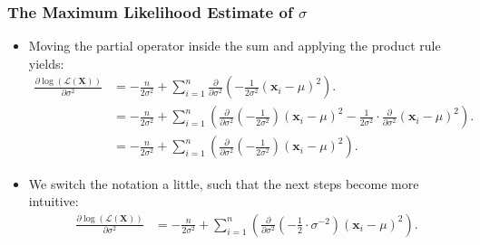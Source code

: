 \begin{frame}
	\frametitle{The Maximum Likelihood Estimate of $\sigma$}
	\begin{itemize}
		\item Moving the partial operator inside the sum and applying the product rule yields:
		      \begin{align}
			      \frac{\partial \log\left(\mathcal{L}(\mathbf{X})\right)}{\partial \sigma^2} & = -\frac{n}{2\sigma^2} + \sum_{i=1}^{n} \frac{\partial}{\partial\sigma^2}\left(-\frac{1}{2\sigma^2} (\mathbf{x}_i-\mu)^2 \right).                                                                                                  \\
			                                                                                  & = -\frac{n}{2\sigma^2} + \sum_{i=1}^{n} \left(\frac{\partial}{\partial\sigma^2} \left(-\frac{1}{2\sigma^2}\right) (\mathbf{x}_i-\mu)^2 - \frac{1}{2\sigma^2} \cdot \frac{\partial}{\partial\sigma^2} (\mathbf{x}_i-\mu)^2 \right). \\
			                                                                                  & = -\frac{n}{2\sigma^2} + \sum_{i=1}^{n} \left(\frac{\partial}{\partial\sigma^2} \left(-\frac{1}{2\sigma^2}\right) (\mathbf{x}_i-\mu)^2\right).
		      \end{align}
		\item We switch the notation a little, such that the next steps become more intuitive:
		      \begin{align}
			      \frac{\partial \log\left(\mathcal{L}(\mathbf{X})\right)}{\partial \sigma^2} & = -\frac{n}{2\sigma^2} + \sum_{i=1}^{n} \left(\frac{\partial}{\partial\sigma^2} \left(-\frac{1}{2}\cdot \sigma^{-2}\right) (\mathbf{x}_i-\mu)^2\right).
		      \end{align}
	\end{itemize}
\end{frame}


